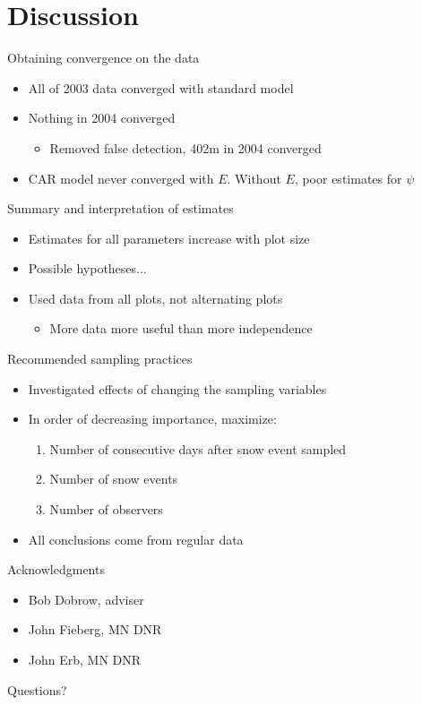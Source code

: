 \documentclass{beamer}
\begin{document}
\section{Discussion}
\begin{frame}{Obtaining convergence on the data}
	\begin{itemize}
		\item All of 2003 data converged with standard model
		\item Nothing in 2004 converged
		\begin{itemize}
			\item Removed false detection, 402m in 2004 converged
		\end{itemize}
		\item CAR model never converged with $E$. Without $E$, poor
		estimates for $\psi$
	\end{itemize}
\end{frame}

\begin{frame}{Summary and interpretation of estimates}
	\begin{itemize}
		\item Estimates for all parameters increase with plot size
		\item Possible hypotheses...
		\item Used data from all plots, not alternating plots
		\begin{itemize}
			\item More data more useful than more independence
		\end{itemize}
	\end{itemize}
\end{frame}

\begin{frame}{Recommended sampling practices}
	\begin{itemize}
		\item Investigated effects of changing the sampling variables
		\item In order of decreasing importance, maximize:
		\begin{enumerate}
			\item Number of consecutive days after snow event sampled
			\item Number of snow events
			\item Number of observers
		\end{enumerate}
		\item All conclusions come from regular data
	\end{itemize}
\end{frame}

\begin{frame}{Acknowledgments}
	\begin{itemize}
		\item Bob Dobrow, adviser
		\item John Fieberg, MN DNR
		\item John Erb, MN DNR
	\end{itemize}
\end{frame}

\begin{frame}{Questions?}
\end{frame}
\end{document}
